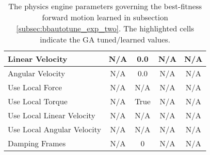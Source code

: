 \begin{table}[htbp]
\begin{tabular}{ | l || c | c | c | c | }
Linear Velocity            & N/A & 0.0    & N/A    & N/A \\ \hline
Angular Velocity           & N/A & 0.0    & N/A    & N/A \\ \hline
Use Local Force            & N/A & N/A    & N/A    & N/A \\ \hline
Use Local Torque           & N/A & True   & N/A    & N/A \\ \hline
Use Local Linear Velocity  & N/A & N/A    & N/A    & N/A \\ \hline
Use Local Angular Velocity & N/A & N/A    & N/A    & N/A \\ \hline
Damping Frames             & N/A & 0      & N/A    & N/A \\ \hline
\end{tabular}
\caption[Physics Engine Parameters Governing Forward Motion Learned]{The physics engine parameters governing the best-fitness forward motion learned in subsection \ref{subsec:bbautotune_exp_two}. The highlighted cells indicate the GA tuned/learned values.}
\label{tab:all_pep_fm_l}
\end{table}